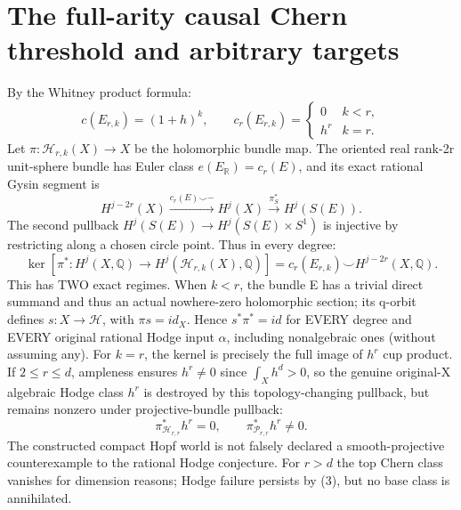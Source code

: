 \documentclass[11pt]{article}
\begin{document}
\section{The full-arity causal Chern threshold and arbitrary targets}
By the Whitney product formula:
\[
 c(E_{r,k})=(1+h)^k,\qquad
 \boxed{c_r(E_{r,k})=
 \begin{cases}0 & k<r,\\h^r & k=r.\end{cases}}\tag{4}
\]
Let $\pi:\mathcal H_{r,k}(X)\to X$ be the holomorphic bundle map.
The oriented real rank-2r unit-sphere bundle has Euler class
$e(E_{\mathbb R})=c_r(E)$, and its exact rational Gysin segment is
\[
 H^{j-2r}(X)\xrightarrow{c_r(E)\smile-}H^j(X)
  \xrightarrow{\pi_S^*}H^j(S(E)).
\]
The second pullback $H^j(S(E))\to H^j(S(E)\times S^1)$ is injective
by restricting along a chosen circle point. Thus in every degree:
\[
 \boxed{\ker[\pi^*:H^j(X,\mathbb Q)\to
 H^j(\mathcal H_{r,k}(X),\mathbb Q)]
 =c_r(E_{r,k})\smile H^{j-2r}(X,\mathbb Q).}\tag{5}
\]
This has TWO exact regimes. When $k<r$, the bundle E has a trivial
direct summand and thus an actual nowhere-zero holomorphic section;
its q-orbit defines $s:X\to\mathcal H$, with $\pi s=id_X$.
Hence $s^*\pi^*=id$ for EVERY degree and EVERY original rational
Hodge input $\alpha$, including nonalgebraic ones (without assuming any).
For $k=r$, the kernel is precisely the full image of $h^r$ cup product.
If $2\le r\le d$, ampleness ensures $h^r\ne0$ since
$\int_Xh^d>0$, so the genuine original-X algebraic Hodge class
$h^r$ is destroyed by this topology-changing pullback, but remains
nonzero under projective-bundle pullback:
\[
 \boxed{\pi_{\mathcal H_{r,r}}^*h^r=0,\qquad
 \pi_{\mathcal P_{r,r}}^*h^r\ne0.}\tag{6}
\]
The constructed compact Hopf world is not falsely declared a
smooth-projective counterexample to the rational Hodge conjecture.
For $r>d$ the top Chern class vanishes for dimension reasons;
Hodge failure persists by (3), but no base class is annihilated.
\end{document}
